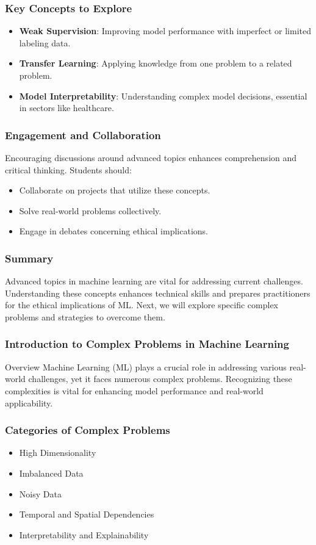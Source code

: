 \documentclass[aspectratio=169]{beamer}
\begin{document}
\begin{frame}[fragile]
    \frametitle{Key Concepts to Explore}
    \begin{itemize}
        \item \textbf{Weak Supervision}: Improving model performance with imperfect or limited labeling data.
        \item \textbf{Transfer Learning}: Applying knowledge from one problem to a related problem.
        \item \textbf{Model Interpretability}: Understanding complex model decisions, essential in sectors like healthcare.
    \end{itemize}
\end{frame}

\begin{frame}[fragile]
    \frametitle{Engagement and Collaboration}
    Encouraging discussions around advanced topics enhances comprehension and critical thinking. Students should:
    \begin{itemize}
        \item Collaborate on projects that utilize these concepts.
        \item Solve real-world problems collectively.
        \item Engage in debates concerning ethical implications.
    \end{itemize}
\end{frame}

\begin{frame}[fragile]
    \frametitle{Summary}
    Advanced topics in machine learning are vital for addressing current challenges. Understanding these concepts enhances technical skills and prepares practitioners for the ethical implications of ML. Next, we will explore specific complex problems and strategies to overcome them.
\end{frame}

\begin{frame}[fragile]
    \frametitle{Introduction to Complex Problems in Machine Learning}
    \begin{block}{Overview}
        Machine Learning (ML) plays a crucial role in addressing various real-world challenges, yet it faces numerous complex problems. Recognizing these complexities is vital for enhancing model performance and real-world applicability.
    \end{block}
\end{frame}

\begin{frame}[fragile]
    \frametitle{Categories of Complex Problems}
    \begin{itemize}
        \item High Dimensionality
        \item Imbalanced Data
        \item Noisy Data
        \item Temporal and Spatial Dependencies
        \item Interpretability and Explainability
    \end{itemize}
\end{frame}
\end{document}
